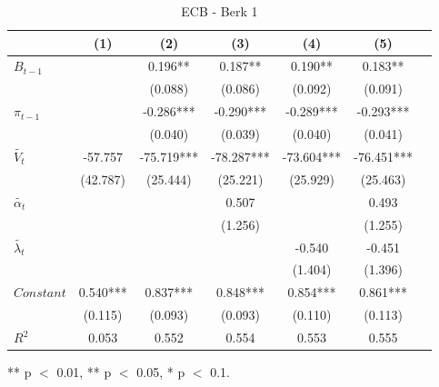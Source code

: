 \documentclass[review]{elsarticle}
\begin{document}
\begin{table}[!ht]
\centering 
  \caption{ECB - Berk 1} 
  \label{tab:ECB - Berk 1}
\begin{tabular}{l*{6}{c}}   
\toprule
                    & (1) & (2) & (3) & (4) & (5) \\
\midrule
$B_{t-1}$           &     & 0.196** & 0.187** & 0.190** & 0.183** \\
                    &     & (0.088) & (0.086) & (0.092) & (0.091) \\
$\pi_{t-1}$         &     & -0.286*** & -0.290*** & -0.289*** & -0.293*** \\
                    &     & (0.040) & (0.039) & (0.040) & (0.041) \\
$\tilde{V_t}$       & -57.757 & -75.719*** & -78.287*** & -73.604*** & -76.451*** \\
                    & (42.787) & (25.444) & (25.221) & (25.929) & (25.463) \\
$\tilde{\alpha_t}$  &     &     & 0.507 &     & 0.493 \\
                    &     &     & (1.256) &     & (1.255) \\
$\tilde{\lambda_t}$ &     &     &     & -0.540 & -0.451 \\
                    &     &     &     & (1.404) & (1.396) \\
$Constant$          & 0.540*** & 0.837*** & 0.848*** & 0.854*** & 0.861*** \\
                    & (0.115) & (0.093) & (0.093) & (0.110) & (0.113) \\
\midrule
$R^2$               & 0.053 & 0.552 & 0.554 & 0.553 & 0.555 \\
\bottomrule
\end{tabular} 
\parbox{0.8\textwidth}{\centering \small *** p $<$ 0.01, ** p $<$ 0.05, * p $<$ 0.1.}
\end{table}
\end{document}

